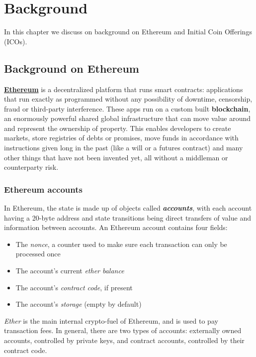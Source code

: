 \label{Chapter2}

\chapter{Background}
In this chapter we discuss on background on Ethereum and Initial Coin Offerings (ICOs).
\section{Background on Ethereum}
\href{https://www.ethereum.org}{\textbf{Ethereum}} is a decentralized platform that runs smart contracts: applications that run exactly as programmed without any possibility of downtime, censorship, fraud or third-party interference.
These apps run on a custom built \textbf{blockchain}, an enormously powerful shared global infrastructure that can move value around and represent the ownership of property.
This enables developers to create markets, store registries of debts or promises, move funds in accordance with instructions given long in the past (like a will or a futures contract) and many other things that have not been invented yet, all without a middleman or counterparty risk.
\subsection{Ethereum accounts}
In Ethereum, the state is made up of objects called \textbf{\textit{accounts}}, with each account having a 20-byte address and state transitions being direct transfers of value and information between accounts. An Ethereum account contains four fields:
\begin{itemize}
    \item The \textit{nonce}, a counter used to make sure each transaction can only be processed once
    \item The account's current \textit{ether balance}
    \item The account's \textit{contract code}, if present
    \item The account's \textit{storage} (empty by default)
\end{itemize}
\textit{Ether} is the main internal crypto-fuel of Ethereum, and is used to pay transaction fees. \newline In general, there are two types of accounts: externally owned accounts, controlled by private keys, and contract accounts, controlled by their contract code.

